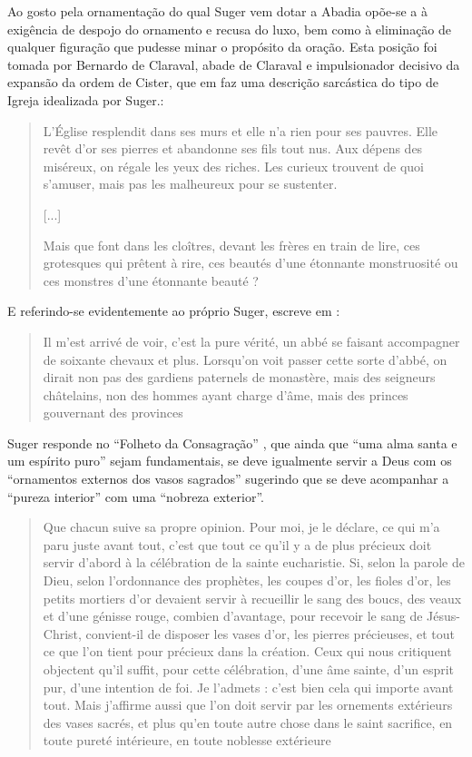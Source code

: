 \documentclass{article}
\begin{document}
Ao gosto pela ornamentação do qual Suger vem dotar a Abadia opõe-se a
à exigência de despojo do ornamento e recusa do luxo, bem como à
eliminação de qualquer figuração que pudesse minar o propósito da
oração. Esta posição foi tomada por Bernardo de Claraval, abade de
Claraval e impulsionador decisivo da expansão da ordem de Cister, que
em \cite{bernard-apologie} faz uma descrição sarcástica do tipo de
Igreja idealizada por Suger.:

\begin{quote}
  L'Église resplendit dans ses murs et elle n'a rien pour ses
  pauvres. Elle revêt d'or ses pierres et abandonne ses fils tout
  nus. Aux dépens des miséreux, on régale les yeux des riches. Les
  curieux trouvent de quoi s'amuser, mais pas les malheureux pour se
  sustenter.

  [...]

  Mais que font dans les cloîtres, devant les frères en train de lire,
  ces grotesques qui prêtent à rire, ces beautés d'une étonnante
  monstruosité ou ces monstres d'une étonnante beauté ?
\end{quote}

E referindo-se evidentemente ao próprio Suger, escreve em
\cite{bernard-critique}:

\begin{quote}
  Il m'est arrivé de voir, c'est la pure vérité, un abbé se faisant
  accompagner de soixante chevaux et plus. Lorsqu'on voit passer cette
  sorte d'abbé, on dirait non pas des gardiens paternels de monastère,
  mais des seigneurs châtelains, non des hommes ayant charge d'âme,
  mais des princes gouvernant des provinces
\end{quote}

Suger responde no ``Folheto da Consagração'' \cite{suger-folheto}, que
ainda que ``uma alma santa e um espírito puro'' sejam fundamentais, se
deve igualmente servir a Deus com os ``ornamentos externos dos vasos
sagrados'' sugerindo que se deve acompanhar a ``pureza interior'' com
uma ``nobreza exterior''.

\begin{quote}
 Que chacun suive sa propre opinion. Pour moi, je le déclare, ce qui
 m'a paru juste avant tout, c'est que tout ce qu'il y a de plus
 précieux doit servir d'abord à la célébration de la sainte
 eucharistie. Si, selon la parole de Dieu, selon l'ordonnance des
 prophètes, les coupes d'or, les fioles d'or, les petits mortiers d'or
 devaient servir à recueillir le sang des boucs, des veaux et d'une
 génisse rouge, combien d'avantage, pour recevoir le sang de
 Jésus-Christ, convient-il de disposer les vases d'or, les pierres
 précieuses, et tout ce que l'on tient pour précieux dans la
 création. Ceux qui nous critiquent objectent qu'il suffit, pour cette
 célébration, d'une âme sainte, d'un esprit pur, d'une intention de
 foi. Je l'admets : c'est bien cela qui importe avant tout. Mais
 j'affirme aussi que l'on doit servir par les ornements extérieurs des
 vases sacrés, et plus qu'en toute autre chose dans le saint
 sacrifice, en toute pureté intérieure, en toute noblesse extérieure
\end{quote}
\end{document}
